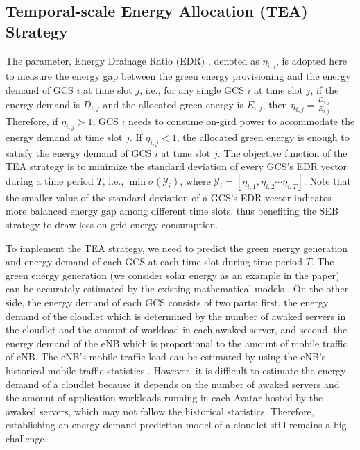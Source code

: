 \documentclass[journal,12pt,draftclsnofoot,onecolumn]{IEEEtran}
\begin{document}
\subsection{Temporal-scale Energy Allocation (TEA) Strategy}
The parameter, Energy Drainage Ratio (EDR) \cite{11}, denoted as $\eta_{i,j}$, is adopted here to measure the energy gap between the green energy provisioning and the energy demand of GCS $i$ at time slot $j$, i.e., for any single GCS $i$ at time slot $j$, if the energy demand is $D_{i,j}$ and the allocated green energy is $E_{i,j}$, then ${\eta _{i,j}} = \frac{{{D_{i,j}}}}{{{E_{i,j}}}}$. Therefore, if $\eta_{i,j}>1$, GCS $i$ needs to consume on-gird power to accommodate the energy demand at time slot $j$. If $\eta_{i,j}<1$, the allocated green energy is enough to satisfy the energy demand of GCS $i$ at time slot $j$. The objective function of the TEA strategy is to minimize the standard deviation of every GCS's EDR vector during a time period $T$, i.e., $\min \sigma \left( {{\bm{\mathcal{Y}}_i}} \right)$,  where ${\bm{\mathcal{Y}}_i} = [{\eta _{i,1}},{\eta _{i,2}} \cdots {\eta _{i,T}}]$. Note that the smaller value of the standard deviation of a GCS's EDR vector indicates more balanced energy gap among different time slots, thus benefiting the SEB strategy to draw less on-grid energy consumption. 

To implement the TEA strategy, we need to predict the green energy generation and energy demand of each GCS at each time slot during time period $T$. The green energy generation (we consider solar energy as an example in the paper) can be accurately estimated by the existing mathematical models \cite{12}. On the other side, the energy demand of each GCS consists of two parts: first, the energy demand of the cloudlet which is determined by the number of awaked servers in the cloudlet and the amount of workload in each awaked server, and second, the energy demand of the eNB which is proportional to the amount of mobile traffic of eNB. The eNB's mobile traffic load can be estimated by using the eNB's historical mobile traffic statistics \cite{11}. However, it is difficult to estimate the energy demand of a cloudlet because it depends on the number of awaked servers and the amount of application workloads running in each Avatar hosted by the awaked servers, which may not follow the historical statistics. Therefore, establishing an energy demand prediction model of a cloudlet still remains a big challenge.
\end{document}
